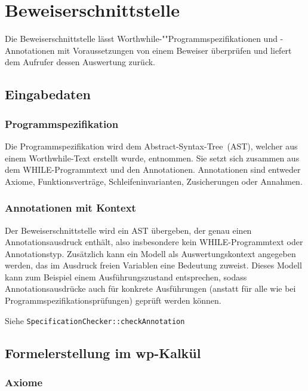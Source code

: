 \section{Beweiserschnittstelle}%

Die Beweiserschnittstelle lässt Worthwhile-""Programmspezifikationen
und -Annotationen mit Voraussetzungen von einem Beweiser überprüfen
und liefert dem Aufrufer dessen Auswertung zurück.%

\subsection{Eingabedaten}%

\subsubsection{Programmspezifikation}%


Die Programmspezifikation wird dem Abstract-Syntax-Tree~(AST), welcher
aus einem Worthwhile-Text erstellt wurde, entnommen. Sie setzt sich
zusammen aus dem WHILE-Programmtext und den Annotationen. Annotationen
sind entweder Axiome, Funktionsverträge, Schleifeninvarianten,
Zusicherungen oder Annahmen.%

\subsubsection{Annotationen mit Kontext}%

Der Beweiserschnittstelle wird ein AST übergeben, der genau einen
Annotationsausdruck enthält, also insbesondere kein WHILE-Programmtext
oder Annotationstyp. Zusätzlich kann ein Modell als Auswertungskontext
angegeben werden, das im Ausdruck freien Variablen eine Bedeutung
zuweist. Dieses Modell kann zum Beispiel einem Ausführungszustand
entsprechen, sodass Annotationsausdrücke auch für konkrete
Ausführungen (anstatt für alle wie bei
Programmspezifikationsprüfungen) geprüft werden können.%

Siehe \texttt{SpecificationChecker::checkAnnotation}%

\subsection{Formelerstellung im wp-Kalkül}%

\subsubsection{Axiome}%

